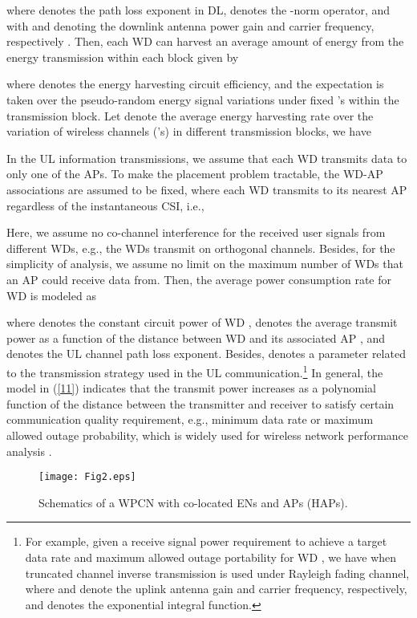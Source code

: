 \documentclass[journal, draftcls, one column, 12pt]{IEEEtran}
\begin{document}
where  denotes the path loss exponent in DL,  denotes the -norm operator, and  with  and  denoting the downlink antenna power gain and carrier frequency, respectively \cite{2005:Goldsmith}. Then, each WD  can harvest an average amount of energy from the energy transmission within each block given by \cite{2013:Zhou}

where  denotes the energy harvesting circuit efficiency, and the expectation is taken over the pseudo-random energy signal variations under fixed 's within the transmission block. Let  denote the average energy harvesting rate over the variation of wireless channels ('s) in different transmission blocks, we have


In the UL information transmissions, we assume that each WD transmits data to only one of the APs. To make the placement problem tractable, the WD-AP associations are assumed to be fixed, where each WD  transmits to its nearest AP  regardless of the instantaneous CSI, i.e.,

Here, we assume no co-channel interference for the received user signals from different WDs, e.g., the WDs transmit on orthogonal channels. Besides, for the simplicity of analysis, we assume no limit on the maximum number of WDs that an AP could receive data from. Then, the average power consumption rate for WD  is modeled as

where  denotes the constant circuit power of WD ,  denotes the average transmit power as a function of the distance between WD  and its associated AP , and  denotes the UL channel path loss exponent. Besides,  denotes a parameter related to the transmission strategy used in the UL communication.\footnote{For example, given a receive signal power requirement  to achieve a target data rate and maximum allowed outage portability  for WD , we have  when truncated channel inverse transmission \cite{2005:Goldsmith} is used under Rayleigh fading channel, where  and  denote the uplink antenna gain and carrier frequency, respectively, and  denotes the exponential integral function.} In general, the model in (\ref{11}) indicates that the transmit power increases as a polynomial function of the distance between the transmitter and receiver to satisfy certain communication quality requirement, e.g., minimum data rate or maximum allowed outage probability, which is widely used for wireless network performance analysis \cite{2005:Hou,2007:Liu}.

\begin{figure}
\centering
  \begin{center}
    \texttt{[image: Fig2.eps]}
  \end{center}
  \caption{Schematics of a WPCN with co-located ENs and APs (HAPs).}
  \label{62}
  \vspace{-5ex}
\end{figure}
\end{document}
